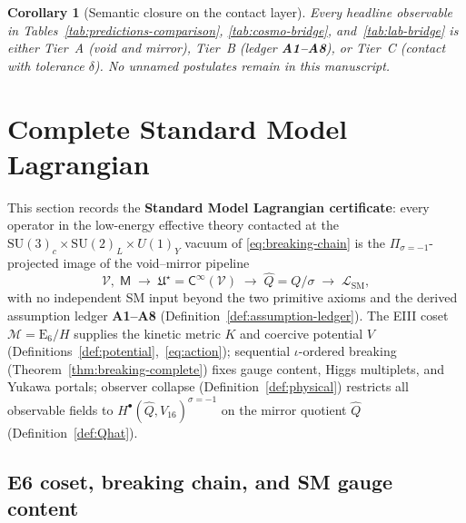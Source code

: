 \documentclass[11pt]{article}
\theoremstyle{plain}
\newtheorem{corollary}[theorem]{Corollary}
\theoremstyle{definition}
\theoremstyle{remark}
\numberwithin{equation}{section}
\newcommand{\E}[1]{\mathrm{E}_{#1}}
\newcommand{\Void}{\mathcal{V}}
\newcommand{\Mirror}{\mathsf{M}}
\newcommand{\Climb}{\mathsf{C}}
\begin{document}
\begin{corollary}[Semantic closure on the contact layer]\label{cor:semantic-closure}
Every headline observable in Tables~\ref{tab:predictions-comparison},
\ref{tab:cosmo-bridge}, and~\ref{tab:lab-bridge} is either Tier~A (void and
mirror), Tier~B (ledger \textbf{A1--A8}), or Tier~C (contact with tolerance
$\delta$). No unnamed postulates remain in this manuscript.
\end{corollary}%
\section{Complete Standard Model Lagrangian}
\label{sec:sm-lagrangian}

This section records the \textbf{Standard Model Lagrangian certificate}:
every operator in the low-energy effective theory contacted at the
$\mathrm{SU}(3)_c\times\mathrm{SU}(2)_L\times U(1)_Y$ vacuum of
\eqref{eq:breaking-chain} is the $\Pi_{\sigma=-1}$-projected image of the
void--mirror pipeline
\begin{equation}\label{eq:sm-pipeline}
  \Void,\;\Mirror
  \;\longrightarrow\;
  \mathfrak{U}^\star=\Climb^\infty(\Void)
  \;\longrightarrow\;
  \hat Q=Q/\sigma
  \;\longrightarrow\;
  \mathcal{L}_{\mathrm{SM}},
\end{equation}
with no independent SM input beyond the two primitive axioms and the derived
assumption ledger \textbf{A1--A8}
(Definition~\ref{def:assumption-ledger}). The EIII coset
$\mathcal{M}=\E{6}/H$ supplies the kinetic metric $K$ and coercive potential
$V$ (Definitions~\ref{def:potential},~\eqref{eq:action}); sequential
$\iota$-ordered breaking (Theorem~\ref{thm:breaking-complete}) fixes gauge
content, Higgs multiplets, and Yukawa portals; observer collapse
(Definition~\ref{def:physical}) restricts all observable fields to
$H^\bullet(\hat Q,V_{16})^{\sigma=-1}$ on the mirror quotient
$\hat Q$ (Definition~\ref{def:Qhat}).

\subsection{E6 coset, breaking chain, and SM gauge content}
\label{sec:sm-lagrangian:breaking}
\end{document}
